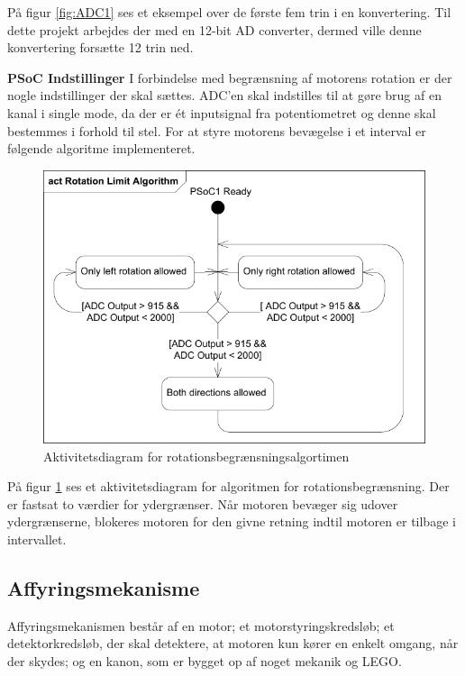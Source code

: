 \noindent På figur \ref{fig:ADC1} ses et eksempel over de første fem trin i en konvertering. Til dette projekt arbejdes der med en 12-bit AD converter, dermed ville denne konvertering forsætte 12 trin ned.  \newline

\noindent \textbf{PSoC Indstillinger} \newline
I forbindelse med begrænsning af motorens rotation er der nogle indstillinger der skal sættes. ADC'en skal indstilles til at gøre brug af en kanal i single mode, da der er ét inputsignal fra potentiometret og denne skal bestemmes i forhold til stel. For at styre motorens bevægelse i et interval er følgende algoritme implementeret.

\begin{figure}[H]
	\centering
	\includegraphics[width=\textwidth]{DesignOgImplementering/images/rotationalgorithm}
	\caption{Aktivitetsdiagram for rotationsbegrænsningsalgortimen}
	\label{fig:rotation}
\end{figure}

\noindent På figur \ref{fig:rotation} ses et aktivitetsdiagram for algoritmen for rotationsbegrænsning. Der er fastsat to værdier for ydergrænser. Når motoren bevæger sig udover ydergrænserne, blokeres motoren for den givne retning indtil motoren er tilbage i intervallet. 

\subsection{Affyringsmekanisme}
Affyringsmekanismen består af en motor; et motorstyringskredsløb; et detektorkredsløb, der skal detektere, at motoren kun kører en enkelt omgang, når der skydes; og en kanon, som er bygget op af noget mekanik og LEGO. 

